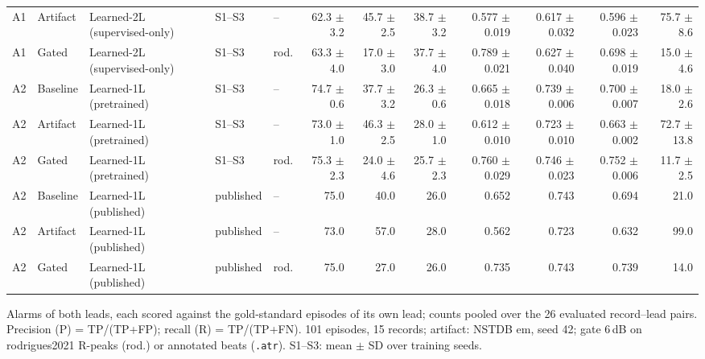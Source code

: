 \begin{table}[htbp]
\begin{tabular}{lllllrrrrrrr}
A1 & Artifact & Learned-2L (supervised-only) & S1--S3 & -- & 62.3 $\pm$ 3.2 & 45.7 $\pm$ 2.5 & 38.7 $\pm$ 3.2 & 0.577 $\pm$ 0.019 & 0.617 $\pm$ 0.032 & 0.596 $\pm$ 0.023 & 75.7 $\pm$ 8.6 \\
A1 & Gated & Learned-2L (supervised-only) & S1--S3 & rod. & 63.3 $\pm$ 4.0 & 17.0 $\pm$ 3.0 & 37.7 $\pm$ 4.0 & 0.789 $\pm$ 0.021 & 0.627 $\pm$ 0.040 & 0.698 $\pm$ 0.019 & 15.0 $\pm$ 4.6 \\
\midrule
A2 & Baseline & Learned-1L (pretrained) & S1--S3 & -- & 74.7 $\pm$ 0.6 & 37.7 $\pm$ 3.2 & 26.3 $\pm$ 0.6 & 0.665 $\pm$ 0.018 & 0.739 $\pm$ 0.006 & 0.700 $\pm$ 0.007 & 18.0 $\pm$ 2.6 \\
A2 & Artifact & Learned-1L (pretrained) & S1--S3 & -- & 73.0 $\pm$ 1.0 & 46.3 $\pm$ 2.5 & 28.0 $\pm$ 1.0 & 0.612 $\pm$ 0.010 & 0.723 $\pm$ 0.010 & 0.663 $\pm$ 0.002 & 72.7 $\pm$ 13.8 \\
A2 & Gated & Learned-1L (pretrained) & S1--S3 & rod. & 75.3 $\pm$ 2.3 & 24.0 $\pm$ 4.6 & 25.7 $\pm$ 2.3 & 0.760 $\pm$ 0.029 & 0.746 $\pm$ 0.023 & 0.752 $\pm$ 0.006 & 11.7 $\pm$ 2.5 \\
\midrule
A2 & Baseline & Learned-1L (published) & published & -- & 75.0 & 40.0 & 26.0 & 0.652 & 0.743 & 0.694 & 21.0 \\
A2 & Artifact & Learned-1L (published) & published & -- & 73.0 & 57.0 & 28.0 & 0.562 & 0.723 & 0.632 & 99.0 \\
A2 & Gated & Learned-1L (published) & published & rod. & 75.0 & 27.0 & 26.0 & 0.735 & 0.743 & 0.739 & 14.0 \\
\bottomrule
\end{tabular}

\par\smallskip\footnotesize Alarms of both leads, each scored against the gold-standard episodes of its own lead; counts pooled over the 26 evaluated record--lead pairs. Precision (P) = TP/(TP+FP); recall (R) = TP/(TP+FN). 101 episodes, 15 records; artifact: NSTDB em, seed 42; gate 6\,dB on rodrigues2021 R-peaks (rod.) or annotated beats (\texttt{.atr}). S1--S3: mean $\pm$ SD over training seeds.
\end{table}
